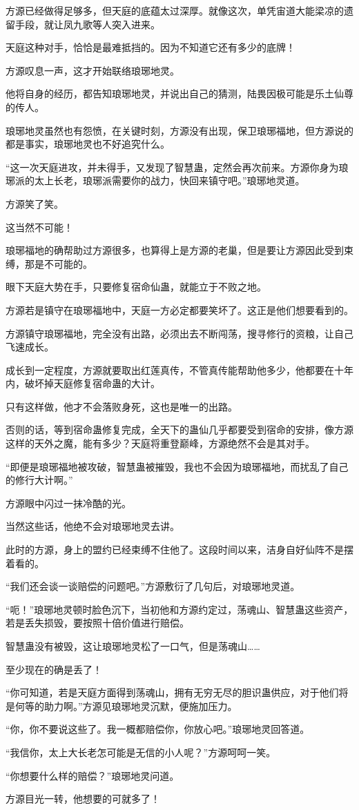 \begin{this_body}
方源已经做得足够多，但天庭的底蕴太过深厚。就像这次，单凭宙道大能梁凉的遗留手段，就让凤九歌等人突入进来。

天庭这种对手，恰恰是最难抵挡的。因为不知道它还有多少的底牌！

方源叹息一声，这才开始联络琅琊地灵。

他将自身的经历，都告知琅琊地灵，并说出自己的猜测，陆畏因极可能是乐土仙尊的传人。

琅琊地灵虽然也有怨愤，在关键时刻，方源没有出现，保卫琅琊福地，但方源说的都是事实，琅琊地灵也不好追究什么。

“这一次天庭进攻，并未得手，又发现了智慧蛊，定然会再次前来。方源你身为琅琊派的太上长老，琅琊派需要你的战力，快回来镇守吧。”琅琊地灵道。

方源笑了笑。

这当然不可能！

琅琊福地的确帮助过方源很多，也算得上是方源的老巢，但是要让方源因此受到束缚，那是不可能的。

眼下天庭大势在手，只要修复宿命仙蛊，就能立于不败之地。

方源若是镇守在琅琊福地中，天庭一方必定都要笑坏了。这正是他们想要看到的。

方源镇守琅琊福地，完全没有出路，必须出去不断闯荡，搜寻修行的资粮，让自己飞速成长。

成长到一定程度，方源就要取出红莲真传，不管真传能帮助他多少，他都要在十年内，破坏掉天庭修复宿命蛊的大计。

只有这样做，他才不会落败身死，这也是唯一的出路。

否则的话，等到宿命蛊修复完成，全天下的蛊仙几乎都要受到宿命的安排，像方源这样的天外之魔，能有多少？天庭将重登巅峰，方源绝然不会是其对手。

“即便是琅琊福地被攻破，智慧蛊被摧毁，我也不会因为琅琊福地，而扰乱了自己的修行大计啊。”

方源眼中闪过一抹冷酷的光。

当然这些话，他绝不会对琅琊地灵去讲。

此时的方源，身上的盟约已经束缚不住他了。这段时间以来，洁身自好仙阵不是摆着看的。

“我们还会谈一谈赔偿的问题吧。”方源敷衍了几句后，对琅琊地灵道。

“呃！”琅琊地灵顿时脸色沉下，当初他和方源约定过，荡魂山、智慧蛊这些资产，若是丢失损毁，要按照十倍价值进行赔偿。

智慧蛊没有被毁，这让琅琊地灵松了一口气，但是荡魂山……

至少现在的确是丢了！

“你可知道，若是天庭方面得到荡魂山，拥有无穷无尽的胆识蛊供应，对于他们将是何等的助力啊。”方源见琅琊地灵沉默，便施加压力。

“你，你不要说这些了。我一概都赔偿你，你放心吧。”琅琊地灵回答道。

“我信你，太上大长老怎可能是无信的小人呢？”方源呵呵一笑。

“你想要什么样的赔偿？”琅琊地灵问道。

方源目光一转，他想要的可就多了！

\end{this_body}

